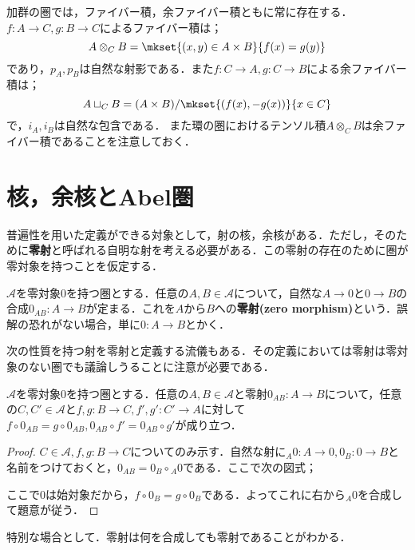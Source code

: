 加群の圏では，ファイバー積，余ファイバー積ともに常に存在する．$f:A\to C,g:B\to C$によるファイバー積は；
\[A\otimes_C B=\mkset{(x,y)\in A\times B}{f(x)=g(y)}\]
であり，$p_A,p_B$は自然な射影である．また$f:C\to A,g:C\to B$による余ファイバー積は；
\[A\sqcup_C B=(A\times B)/\mkset{(f(x),-g(x))}{x\in C}\]
で，$i_A,i_B$は自然な包含である．
また環の圏におけるテンソル積$A\otimes_C B$は余ファイバー積であることを注意しておく．
\section{核，余核とAbel圏}

普遍性を用いた定義ができる対象として，射の核，余核がある．ただし，そのために\textbf{零射}と呼ばれる自明な射を考える必要がある．この零射の存在のために圏が零対象を持つことを仮定する．

\begin{defi}[零射]
	$\mathscr{A}$を零対象$0$を持つ圏とする．任意の$A,B\in\mathscr{A}$について，自然な$A\to 0$と$0\to B$の合成$0_{AB}:A\to B$が定まる．これを$A$から$B$への\textbf{零射(zero morphism)}という．誤解の恐れがない場合，単に$0:A\to B$とかく．
\end{defi}

次の性質を持つ射を零射と定義する流儀もある．その定義においては零射は零対象のない圏でも議論しうることに注意が必要である．
\begin{prop}
	$\mathscr{A}$を零対象$0$を持つ圏とする．任意の$A,B\in\mathscr{A}$と零射$0_{AB}:A\to B$について，任意の$C,C'\in\mathscr{A}$と$f,g:B\to C, f',g':C'\to A$に対して$f\circ0_{AB}=g\circ0_{AB}, 0_{AB}\circ f'=0_{AB}\circ g'$が成り立つ． 
\end{prop}
\begin{proof}
	$C\in\mathscr{A}, f,g:B\to C$についてのみ示す．自然な射に${}_A0:A\to0,0_B:0\to B$と名前をつけておくと，$0_{AB}=0_B\circ{}_A0$である．ここで次の図式；
	\begin{figure}[H]
		\centering
	\end{figure}
	ここで$0$は始対象だから，$f\circ 0_B=g\circ 0_B$である．よってこれに右から${}_A0$を合成して題意が従う．
\end{proof}

特別な場合として．零射は何を合成しても零射であることがわかる．

